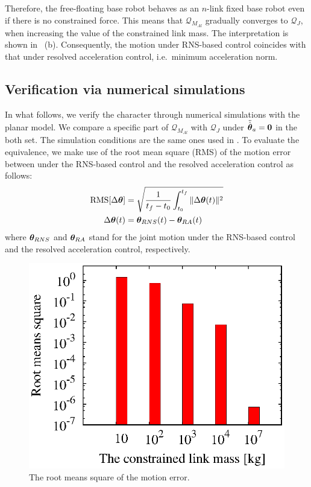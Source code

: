 %
Therefore,
the free-floating base robot behaves as an $n$-link fixed
base robot even if there is no constrained force.
This means that $\mathcal{Q}_{M_{Al}}$ gradually converges to $\mathcal{Q}_{J}$,
when increasing the value of the constrained link mass.
The interpretation is shown in ~(b).
Consequently,
the motion under RNS-based control coincides with that under resolved acceleration control,
i.e.\ minimum acceleration norm.

\subsection{Verification via numerical simulations}
In what follows,
we verify the character through numerical simulations with the planar model.
We compare a specific part of $\mathcal{Q}_{M_{Al}}$ with $\mathcal{Q}_{J}$
under ${\ddot{\hat{\bm{\theta}}}}_{a} = \bm{0}$ in the both set.
The simulation conditions are the same ones used in .
To evaluate the equivalence,
we make use of the root mean square (RMS) of the motion error between
under the RNS-based control and the resolved acceleration control as follows:
%
\begin{align}
  \mathrm{RMS}[\Delta {\bm{\theta}}] &= \sqrt{\frac{1}{t_{f} - t_{0}}\int_{t_{0}}^{t_{f}}\|\Delta {\bm{\theta}}(t)\|^{2}}\\
  \Delta {\bm{\theta}}(t) &= {\bm{\theta}}_{RNS}(t) - {\bm{\theta}}_{RA}(t)
  \label{eq:RMS}
\end{align}
%
where ${\bm{\theta}}_{RNS}$ and ${\bm{\theta}}_{RA}$ stand for
the joint motion under the RNS-based control and the resolved acceleration control, respectively.
%
\begin{figure}[t]
  \centering
  \begin{minipage}{0.75\linewidth}
    \centering
    \includegraphics[width=1.0\linewidth]{fig/chapter7/mass/rms_planar.eps}
  \end{minipage}
  \caption{The root means square of the motion error.}
  \label{fig:RES_RMS}
\end{figure}

